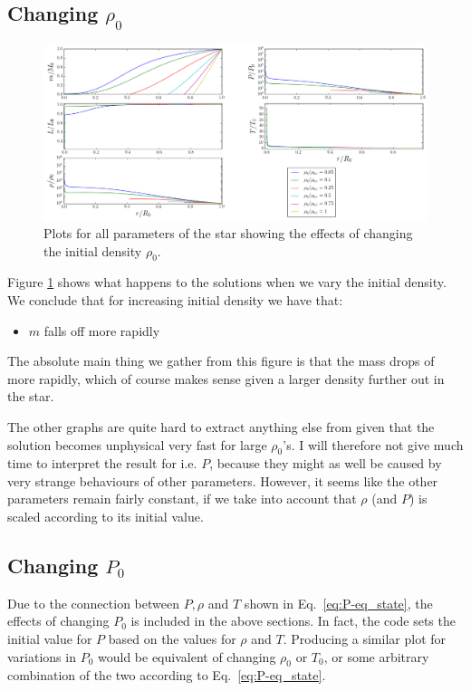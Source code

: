 \documentclass[11pt,twocolumn]{article}
\begin{document}
\subsection{Changing $\rho_0$}

\begin{figure}[ht]
  \centering
  \includegraphics[width=\linewidth]{fig/rho_variation.png}
  \caption{\label{fig:rho-variation} Plots for all parameters of the star
  showing the effects of changing the initial density $\rho_0$.}
\end{figure}

Figure \ref{fig:rho-variation} shows what happens to the solutions
when we vary the initial density. We conclude that for increasing
initial density we have that:

\begin{itemize}
\item $m$ falls off more rapidly
\end{itemize}

The absolute main thing we gather from this figure is that the mass
drops of more rapidly, which of course makes sense given a larger
density further out in the star. 

The other graphs are quite hard to extract anything else from given
that the solution becomes unphysical very fast for large
$\rho_0$'s. I will therefore not give much time to interpret the
result for i.e. $P$, because they might as well be caused by very
strange behaviours of other parameters. However, it seems like the
other parameters remain fairly constant, if we take into account that
$\rho$ (and $P$) is scaled according to its initial value. 


\subsection{Changing $P_0$}
Due to the connection between $P,\rho$ and $T$ shown in
Eq.~\eqref{eq:P-eq_state}, the effects of changing $P_0$ is included
in the above sections. In fact, the code sets the initial value for
$P$ based on the values for $\rho$ and $T$. Producing a similar plot
for variations in $P_0$ would be equivalent of changing $\rho_0$ or
$T_0$, or some arbitrary combination of the two according to Eq.~\eqref{eq:P-eq_state}.
\end{document}
